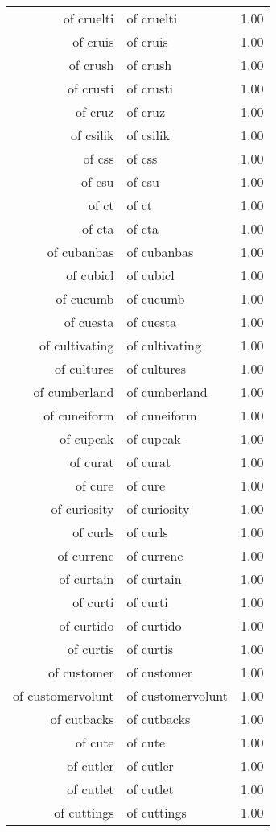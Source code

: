 \begin{table}[ht]
\begin{tabular}{rlr}
  of cruelti & of cruelti & 1.00 \\ 
  of cruis & of cruis & 1.00 \\ 
  of crush & of crush & 1.00 \\ 
  of crusti & of crusti & 1.00 \\ 
  of cruz & of cruz & 1.00 \\ 
  of csilik & of csilik & 1.00 \\ 
  of css & of css & 1.00 \\ 
  of csu & of csu & 1.00 \\ 
  of ct & of ct & 1.00 \\ 
  of cta & of cta & 1.00 \\ 
  of cubanbas & of cubanbas & 1.00 \\ 
  of cubicl & of cubicl & 1.00 \\ 
  of cucumb & of cucumb & 1.00 \\ 
  of cuesta & of cuesta & 1.00 \\ 
  of cultivating & of cultivating & 1.00 \\ 
  of cultures & of cultures & 1.00 \\ 
  of cumberland & of cumberland & 1.00 \\ 
  of cuneiform & of cuneiform & 1.00 \\ 
  of cupcak & of cupcak & 1.00 \\ 
  of curat & of curat & 1.00 \\ 
  of cure & of cure & 1.00 \\ 
  of curiosity & of curiosity & 1.00 \\ 
  of curls & of curls & 1.00 \\ 
  of currenc & of currenc & 1.00 \\ 
  of curtain & of curtain & 1.00 \\ 
  of curti & of curti & 1.00 \\ 
  of curtido & of curtido & 1.00 \\ 
  of curtis & of curtis & 1.00 \\ 
  of customer & of customer & 1.00 \\ 
  of customervolunt & of customervolunt & 1.00 \\ 
  of cutbacks & of cutbacks & 1.00 \\ 
  of cute & of cute & 1.00 \\ 
  of cutler & of cutler & 1.00 \\ 
  of cutlet & of cutlet & 1.00 \\ 
  of cuttings & of cuttings & 1.00 \\ 

\end{tabular}
\end{table}
